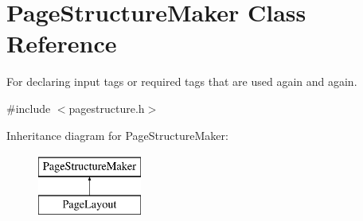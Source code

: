 \hypertarget{classPageStructureMaker}{\section{Page\-Structure\-Maker Class Reference}
\label{classPageStructureMaker}
}


For declaring input tags or required tags that are used again and again.  




{\ttfamily \#include $<$pagestructure.\-h$>$}

Inheritance diagram for Page\-Structure\-Maker\-:\begin{figure}[H]
\begin{center}
\leavevmode
\includegraphics[height=2.000000cm]{classPageStructureMaker}
\end{center}
\end{figure}

